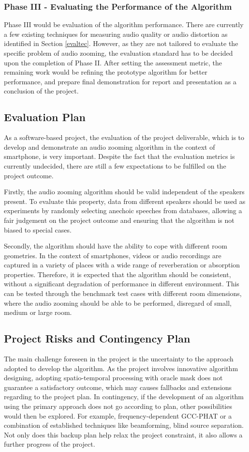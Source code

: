 \documentclass[a4paper,twoside,12pt,hidelinks]{article}
\begin{document}
\subsubsection{Phase III - Evaluating the Performance of the Algorithm}
Phase III would be evaluation of the algorithm performance. There are currently a few existing techniques for measuring audio quality or audio distortion as identified in Section \ref{evaltec}. However, as they are not tailored to evaluate the specific problem of audio zooming, the evaluation standard has to be decided upon the completion of Phase II. After setting the assessment metric, the remaining work would be refining the prototype algorithm for better performance, and prepare final demonstration for report and presentation as a conclusion of the project.

\subsection{Evaluation Plan}
As a software-based project, the evaluation of the project deliverable, which is to develop and demonstrate an audio zooming algorithm in the context of smartphone, is very important. Despite the fact that the evaluation metrics is currently undecided, there are still a few expectations to be fulfilled on the project outcome.

Firstly, the audio zooming algorithm should be valid independent of the speakers present. To evaluate this property, data from different speakers should be used as experiments by randomly selecting anechoic speeches from databases, allowing a fair judgement on the project outcome and ensuring that the algorithm is not biased to special cases.

Secondly, the algorithm should have the ability to cope with different room geometries. In the context of smartphones, videos or audio recordings are captured in a variety of places with a wide range of reverberation or absorption properties. Therefore, it is expected that the algorithm should be consistent, without a significant degradation of performance in different environment. This can be tested through the benchmark test cases with different room dimensions, where the audio zooming should be able to be performed, disregard of small, medium or large room.

\subsection{Project Risks and Contingency Plan}
The main challenge foreseen in the project is the uncertainty to the approach adopted to develop the algorithm. As the project involves innovative algorithm designing, adopting spatio-temporal processing with oracle mask does not guarantee a satisfactory outcome, which may causes fallbacks and extensions regarding to the project plan. In contingency, if the development of an algorithm using the primary approach does not go according to plan, other possibilities would then be explored. For example, frequency-dependent GCC-PHAT or a combination of established techniques like beamforming, blind source separation. Not only does this backup plan help relax the project constraint, it also allows a further progress of the project.
\end{document}

